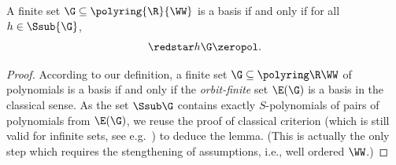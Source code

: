 %
%
%

\begin{lemma} \label{lem:equivariant buch cri}
A finite set $\G \subseteq \polyring{\R}{\WW}$ is a \Gr basis 
if and only if for all $h \in \Ssub{\G}$,
\[
\redstar h \G \zeropol.
\]
\end{lemma}
%
\begin{proof}
According to our definition, 
a finite set $\G\subseteq \polyring \R \WW$ of polynomials is a \Gr basis
if and only if the \emph{orbit-finite} set $\E(\G)$
is a \Gr basis in the classical sense.
As the set $\Ssub \G$ contains exactly $S$-polynomials of pairs of polynomials from $\E(\G)$,
we reuse the proof of classical \Bu criterion 
(which is still valid for infinite sets,
see e.g.~\cite[Chapter~2]{Cox15})
to deduce the lemma.
(This is actually the only step which requires the stengthening of assumptions, i.e.,
well ordered $\WW$.)
%
\end{proof}
%

